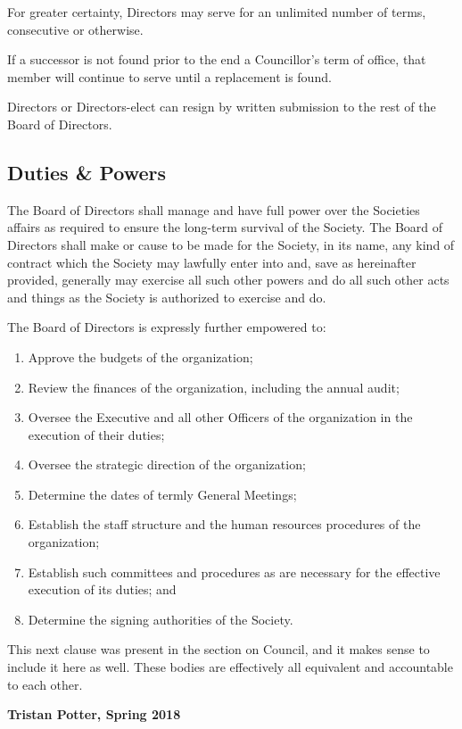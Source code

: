 For greater certainty, Directors may serve for an unlimited number of terms, 
consecutive or otherwise. 

If a successor is not found prior to the end a Councillor's term of office, that
member will continue to serve until a replacement is found. 

Directors or Directors-elect can resign by written submission to the rest of
the Board of Directors. 

\subsection{Duties \& Powers}

The Board of Directors shall manage and have full power over the Societies
affairs as required to ensure the long-term survival of the Society.  The Board
of Directors shall make or cause to be made for the Society, in its name, any
kind of contract which the Society may lawfully enter into and, save as
hereinafter provided, generally may exercise all such other powers and do all
such other acts and things as the Society is authorized to exercise and do.

The Board of Directors is expressly further empowered to:
\begin{enumerate}
    \item Approve the budgets of the organization;
    \item Review the finances of the organization, including the annual audit;
    \item Oversee the Executive and all other Officers of the organization in
        the execution of their duties;
    \item Oversee the strategic direction of the organization;
    \item Determine the dates of termly General Meetings;
    \item Establish the staff structure and the human resources procedures of
        the organization;
    \item Establish such committees and procedures as are necessary for the
        effective execution of its duties; and
    \item Determine the signing authorities of the Society. 
\end{enumerate}

\begin{annotation}
    This next clause was present in the section on Council, and it makes sense
    to include it here as well. These bodies are effectively all equivalent
    and accountable to each other.

    \textbf{Tristan Potter, Spring 2018}
\end{annotation}

